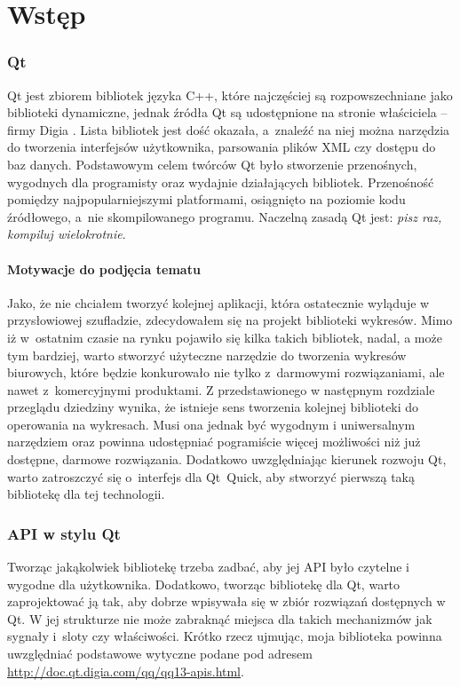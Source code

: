 \part{Wstęp}
\section{Qt}
Qt jest zbiorem bibliotek języka C++, które najczęściej są rozpowszechniane jako biblioteki dynamiczne, jednak źródła Qt są udostępnione na stronie właściciela -- firmy Digia \cite{digia}. Lista bibliotek jest dość okazała, a~znaleźć na niej można narzędzia do tworzenia interfejsów użytkownika, parsowania plików XML czy dostępu do baz danych. Podstawowym celem twórców Qt było stworzenie przenośnych, wygodnych dla programisty oraz wydajnie działających bibliotek. Przenośność pomiędzy najpopularniejszymi platformami, osiągnięto na poziomie kodu źródłowego, a~nie skompilowanego programu. Naczelną zasadą Qt jest: \textit{pisz raz, kompiluj wielokrotnie}. 

\subsection{Motywacje do podjęcia tematu}
Jako, że nie chciałem tworzyć kolejnej aplikacji, która ostatecznie wyląduje w przysłowiowej szufladzie, zdecydowałem się na projekt biblioteki wykresów. Mimo iż w~ostatnim czasie na rynku pojawiło się kilka takich bibliotek, nadal, a może tym bardziej, warto stworzyć użyteczne narzędzie do tworzenia wykresów biurowych, które będzie konkurowało nie tylko z~darmowymi rozwiązaniami, ale nawet z~komercyjnymi produktami. Z przedstawionego w następnym rozdziale przeglądu dziedziny wynika, że istnieje sens tworzenia kolejnej biblioteki do operowania na wykresach. Musi ona jednak być wygodnym i uniwersalnym narzędziem oraz powinna udostępniać pogramiście więcej możliwości niż już dostępne, darmowe rozwiązania. Dodatkowo uwzględniając kierunek rozwoju Qt, warto zatroszczyć się o~interfejs dla Qt~Quick, aby stworzyć pierwszą taką bibliotekę dla tej technologii.


\section{API w stylu Qt}
Tworząc jakąkolwiek bibliotekę trzeba zadbać, aby jej API było czytelne i wygodne dla użytkownika. Dodatkowo, tworząc bibliotekę dla Qt, warto zaprojektować ją tak, aby dobrze wpisywała się w zbiór rozwiązań dostępnych w Qt. W jej strukturze nie może zabraknąć miejsca dla takich mechanizmów jak sygnały i~sloty czy właściwości. Krótko rzecz ujmując, moja biblioteka powinna uwzględniać podstawowe wytyczne podane pod adresem \url{http://doc.qt.digia.com/qq/qq13-apis.html}.

